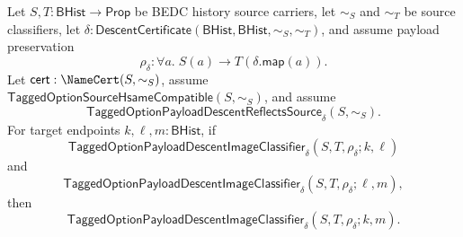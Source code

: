 \begin{theorem}
\label{thm:tagged-option-payload-descent-image-classifier-reflective-transitivity}
Let $S,T:\mathsf{BHist}\to\mathsf{Prop}$ be BEDC history source carriers, let
$\sim_S$ and $\sim_T$ be source classifiers, let
$\delta:\mathsf{DescentCertificate}(\mathsf{BHist},\mathsf{BHist},\sim_S,\sim_T)$,
and assume payload preservation
$$
\rho_{\delta}:\forall a.\;S(a)\to T(\delta.\mathsf{map}(a)).
$$
Let $\mathsf{cert}:\NameCert(S,\sim_S)$, assume
$\mathsf{TaggedOptionSourceHsameCompatible}(S,\sim_S)$, and assume
$$
\mathsf{TaggedOptionPayloadDescentReflectsSource}_{\delta}(S,\sim_S).
$$
For target endpoints $k,\ell,m:\mathsf{BHist}$, if
$$
\mathsf{TaggedOptionPayloadDescentImageClassifier}_{\delta}
(S,T,\rho_{\delta};k,\ell)
$$
and
$$
\mathsf{TaggedOptionPayloadDescentImageClassifier}_{\delta}
(S,T,\rho_{\delta};\ell,m),
$$
then
$$
\mathsf{TaggedOptionPayloadDescentImageClassifier}_{\delta}
(S,T,\rho_{\delta};k,m).
$$
\end{theorem}

